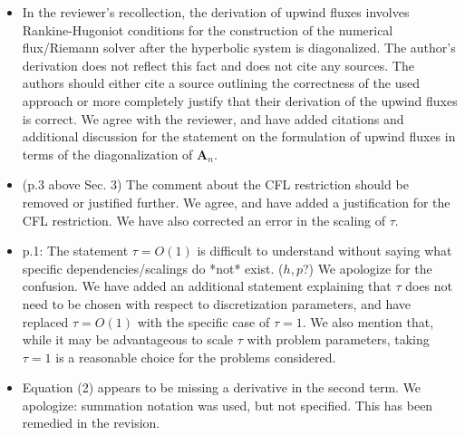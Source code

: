 \documentclass[10pt]{article}
\newcommand{\note}[1]{{\color{blue}#1}}
\begin{document}
\begin{itemize}
\item In the reviewer's recollection, the derivation of upwind fluxes involves Rankine-Hugoniot conditions for the construction of the numerical flux/Riemann solver after the hyperbolic system is diagonalized. The author's derivation does not reflect this fact and does not cite any sources. The authors should either cite a source outlining the correctness of the used approach or more completely justify that their derivation of the upwind fluxes is correct.  
\note{We agree with the reviewer, and have added citations and additional discussion for the statement on the formulation of upwind fluxes in terms of the diagonalization of $\bm{A}_n$. }
\item (p.3 above Sec. 3) The comment about the CFL restriction should be removed or justified further.
\note{We agree, and have added a justification for the CFL restriction.  We have also corrected an error in the scaling of $\tau$.}
\item p.1: The statement $\tau=O(1)$ is difficult to understand without saying what specific dependencies/scalings do *not* exist. ($h,p$?)
\note{We apologize for the confusion.  We have added an additional statement explaining that $\tau$ does not need to be chosen with respect to discretization parameters, and have replaced $\tau = O(1)$ with the specific case of $\tau = 1$.  We also mention that, while it may be advantageous to scale $\tau$ with problem parameters, taking $\tau = 1$ is a reasonable choice for the problems considered.}
\item Equation (2) appears to be missing a derivative in the second term.
\note{We apologize: summation notation was used, but not specified.  This has been remedied in the revision.}

\end{itemize}
\end{document}
